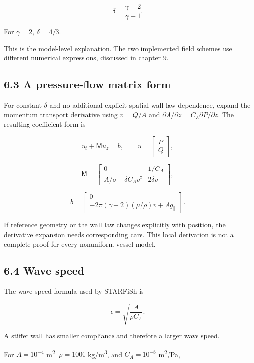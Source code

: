 \documentclass[11pt,a4paper]{article}
\begin{document}
\begingroup\small
\[
\delta=\frac{\gamma+2}{\gamma+1}.
\]
\endgroup


For \(\gamma=2\), \(\delta=4/3\).

This is the model-level explanation. The two implemented field schemes use different numerical expressions, discussed in chapter 9.

\subsection{6.3 A pressure-flow matrix form}
For constant \(\delta\) and no additional explicit spatial wall-law dependence, expand the momentum transport derivative using \(v=Q/A\) and \(\partial A/\partial z=C_A\partial P/\partial z\). The resulting coefficient form is


\begingroup\small
\[
u_t+\mathsf M u_z=b,\qquad
u=\begin{bmatrix}P\\Q\end{bmatrix},
\]
\endgroup



\begingroup\small
\[
\mathsf M=
\begin{bmatrix}
0&1/C_A\\
A/\rho-\delta C_Av^2&2\delta v
\end{bmatrix},
\]
\endgroup



\begingroup\small
\[
b=
\begin{bmatrix}
0\\
-2\pi(\gamma+2)(\mu/\rho)v+A g_\parallel
\end{bmatrix}.
\]
\endgroup


If reference geometry or the wall law changes explicitly with position, the derivative expansion needs corresponding care. This local derivation is not a complete proof for every nonuniform vessel model.

\subsection{6.4 Wave speed}
The wave-speed formula used by STARFiSh is


\begingroup\small
\[
c=\sqrt{\frac{A}{\rho C_A}}.
\]
\endgroup


A stiffer wall has smaller compliance and therefore a larger wave speed.

For \(A=10^{-4}\) m\textsuperscript{2}, \(\rho=1000\) kg/m\textsuperscript{3}, and \(C_A=10^{-8}\) m\textsuperscript{2}/Pa,
\end{document}
